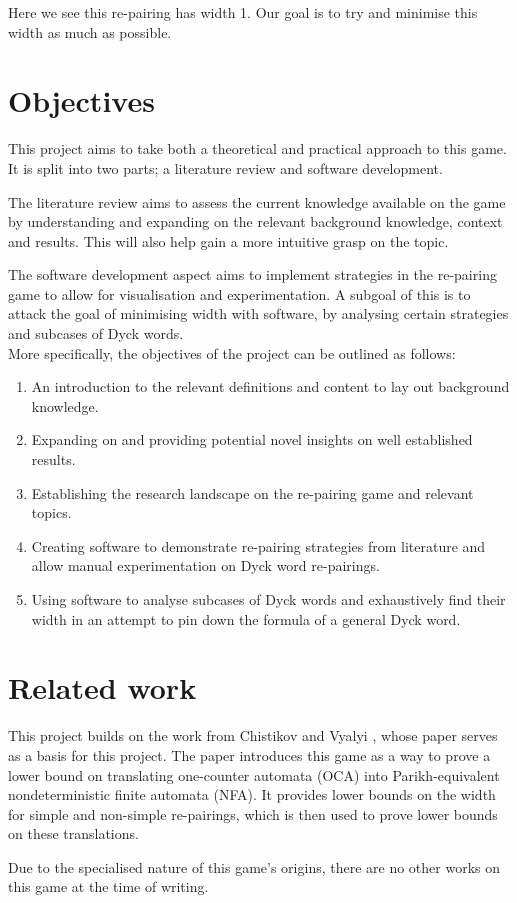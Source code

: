 Here we see this re-pairing has width 1. Our goal is to try and minimise this width as much as possible. 


\section{Objectives}

This project aims to take both a theoretical and practical approach to this game. It is split into two parts; a literature review and software development.

The literature review aims to assess the current knowledge available on the game by understanding and expanding on the relevant background knowledge, context and results. This will also help gain a more intuitive grasp on the topic. 

The software development aspect aims to implement strategies in the re-pairing game to allow for visualisation and experimentation. A subgoal of this is to attack the goal of minimising width with software, by analysing certain strategies and subcases of Dyck words. \\
More specifically, the objectives of the project can be outlined as follows:

\begin{enumerate}
    \item An introduction to the relevant definitions and content to lay out background knowledge.
    \item Expanding on and providing potential novel insights on well established results.
    \item Establishing the research landscape on the re-pairing game and relevant topics.
    \item Creating software to demonstrate re-pairing strategies from literature and allow manual experimentation on Dyck word re-pairings.
    \item Using software to analyse subcases of Dyck words and exhaustively find their width in an attempt to pin down the formula of a general Dyck word.
\end{enumerate}

\section{Related work}
This project builds on the work from Chistikov and Vyalyi \cite{chistikov2020re}, whose paper serves as a basis for this project. The paper introduces this game as a way to prove a lower bound on translating one-counter automata (OCA) into Parikh-equivalent nondeterministic finite automata (NFA). It provides lower bounds on the width for simple and non-simple re-pairings, which is then used to prove lower bounds on these translations.

Due to the specialised nature of this game's origins, there are no other works on this game at the time of writing.